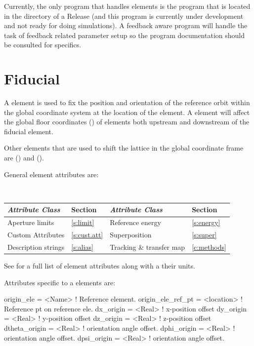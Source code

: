 Currently, the only program that handles  elements is the  program that
is located in the  directory of a  Release (and this program is currently under
development and not ready for doing simulations). A feedback aware program will handle the task
of feedback related parameter setup so the program documentation should be consulted for specifics.

\newpage

\section{Fiducial}
\label{s:fiducial}

A  element is used to fix the position and orientation of the reference orbit within
the global coordinate system at the location of the  element. A  element
will affect the global floor coordinates () of elements both upstream and downstream
of the fiducial element.

Other elements that are used to shift the lattice in the global coordinate frame are
 () and  ().

General  element attributes are:
\begin{center}
\tt
\begin{tabular}{llll} \toprule
  {\sl Attribute Class}      & Section           & {\sl Attribute Class}      & Section         \\ \midrule
  Aperture limits            & \ref{s:limit}     & Reference energy           & \ref{s:energy}  \\
  Custom Attributes          & \ref{s:cust.att}  & Superposition              & \ref{s:super}   \\
  Description strings        & \ref{s:alias}     & Tracking \& transfer map   & \ref{c:methods} \\ 
  \bottomrule
\end{tabular}
\end{center}
\toffset
See  for a full list of element attributes along with a their units.

Attributes specific to a  elements are:
\begin{example}
  origin_ele        = <Name>     ! Reference element.
  origin_ele_ref_pt = <location> ! Reference pt on reference ele.
  dx_origin         = <Real>     ! x-position offset
  dy_origin         = <Real>     ! y-position offset
  dz_origin         = <Real>     ! z-position offset
  dtheta_origin     = <Real>     ! orientation angle offset.
  dphi_origin       = <Real>     ! orientation angle offset.
  dpsi_origin       = <Real>     ! orientation angle offset.
\end{example}

